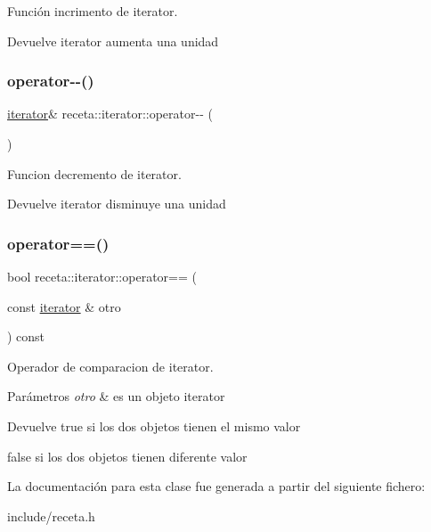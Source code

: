 Función incrimento de iterator. 

\begin{DoxyReturn}{Devuelve}
iterator aumenta una unidad 
\end{DoxyReturn}
\mbox{\label{classreceta_1_1iterator_a3983fab3725f8a1fbf54987323bc9be1}} 
\subsubsection{\texorpdfstring{operator-\/-\/()}{operator--()}}
{\footnotesize\ttfamily \hyperlink{classreceta_1_1iterator}{iterator}\& receta\+::iterator\+::operator-\/-\/ (\begin{DoxyParamCaption}{ }\end{DoxyParamCaption})}



Funcion decremento de iterator. 

\begin{DoxyReturn}{Devuelve}
iterator disminuye una unidad 
\end{DoxyReturn}
\mbox{\label{classreceta_1_1iterator_ae3b309ab89eebb443bb1328a56f0b7fb}} 
\subsubsection{\texorpdfstring{operator==()}{operator==()}}
{\footnotesize\ttfamily bool receta\+::iterator\+::operator== (\begin{DoxyParamCaption}\item[{const \hyperlink{classreceta_1_1iterator}{iterator} \&}]{otro }\end{DoxyParamCaption}) const}



Operador de comparacion de iterator. 


\begin{DoxyParams}{Parámetros}
{\em otro} & es un objeto iterator \\
\hline
\end{DoxyParams}
\begin{DoxyReturn}{Devuelve}
true si los dos objetos tienen el mismo valor 

false si los dos objetos tienen diferente valor 
\end{DoxyReturn}


La documentación para esta clase fue generada a partir del siguiente fichero\+:\begin{DoxyCompactItemize}
\item 
include/receta.\+h\end{DoxyCompactItemize}
